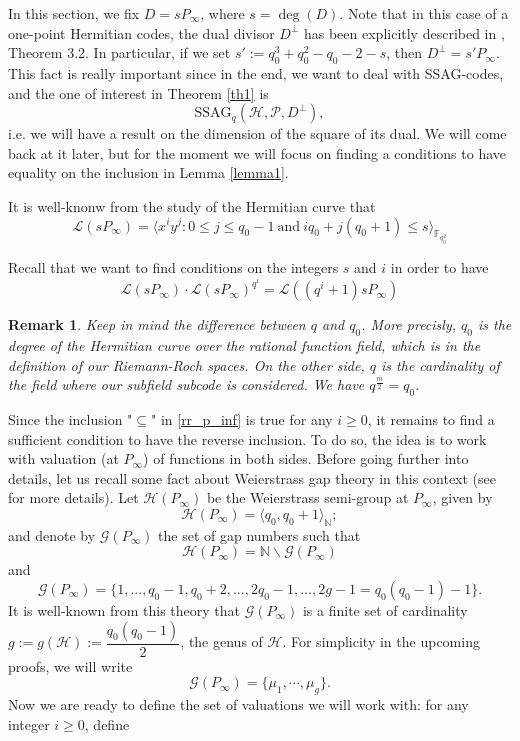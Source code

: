 \documentclass[a4paper]{article}
\newtheorem{rq1}{Remark}
\newcommand{\calP}{\mathcal{P}}
\newcommand{\calH}{\mathcal{H}}
\newcommand{\calL}{\mathcal{L}}
\begin{document}
In this section, we fix $D=sP_{\infty}$, where $s=\deg(D)$. Note that in this case of a one-point Hermitian codes, the dual divisor $D^{\perp}$ has been explicitly described in \cite{sabi}, Theorem 3.2. In particular, if we set $s' := q_0^3+q_0^2-q_0-2-s$, then $D^{\perp} = s'P_{\infty}$. This fact is really important since in the end, we want to deal with \textrm{SSAG}-codes, and the one of interest in Theorem \ref{th1} is 
\[\mathrm{SSAG}_{q}(\calH,\calP,D^{\perp}),\]
i.e. we will have a result on the dimension of the square of its dual. We will come back at it later, but for the moment we will focus on finding a conditions to have equality on the inclusion in Lemma \ref{lemma1}. 

\noindent It is well-knonw from the study of the Hermitian curve that
\begin{equation} \label{rr_p_inf}
\calL(sP_{\infty}) = \langle x^iy^j : 0 \leq j \leq q_0-1 \ \mathrm{and} \ iq_0+j(q_0+1) \leq s \rangle_{\mathbb{F}_{q_0^2}}
\end{equation}

Recall that we want to find conditions on the integers $s$ and $i$ in order to have 
\begin{equation} \label{equality}
\calL(sP_{\infty}) \cdot \calL(sP_{\infty})^{q^i} = \calL((q^i+1)sP_{\infty})  
\end{equation}

\begin{rq1}
Keep in mind the difference between $q$ and $q_0$. More precisly, $q_0$ is the degree of the Hermitian curve over the rational function field, which is in the definition of our Riemann-Roch spaces. On the other side, $q$ is the cardinality of the field where our subfield subcode is considered. We have $q^{\frac{m}{2}}=q_0$.
\end{rq1}

Since the inclusion "$\subseteq$" in \eqref{rr_p_inf} is true for any $i \geq 0$, it remains to find a sufficient condition to have the reverse inclusion. To do so, the idea is to work with valuation (at $P_{\infty}$) of functions in both sides. Before going further into details, let us recall some fact about Weierstrass gap theory in this context (see \cite{sti} for more details).
Let $\calH(P_{\infty})$ be the Weierstrass semi-group at $P_{\infty}$, given by
\[\calH(P_{\infty}) = \langle q_0,q_0+1 \rangle_{\mathbb{N}};\]
and denote by  $\mathcal{G}(P_{\infty})$ the set of gap numbers such that
\[\calH(P_{\infty}) = \mathbb{N} \backslash \mathcal{G}(P_{\infty})\]
and 
\[\mathcal{G}(P_{\infty}) = \{1,...,q_0-1,q_0+2,...,2q_0-1,...,2g-1=q_0(q_0-1)-1\}.\]
It is well-known from this theory that $\mathcal{G}(P_{\infty})$ is a finite set of cardinality $g:=g(\calH) := \dfrac{q_0(q_0-1)}{2}$, the genus of $\calH$. For simplicity in the upcoming proofs, we will write 
\[\mathcal{G}(P_{\infty}) = \{\mu_1,\cdots,\mu_g\}.\]
Now we are ready to define the set of valuations we will work with: for any integer $i \geq 0$, define
\end{document}
